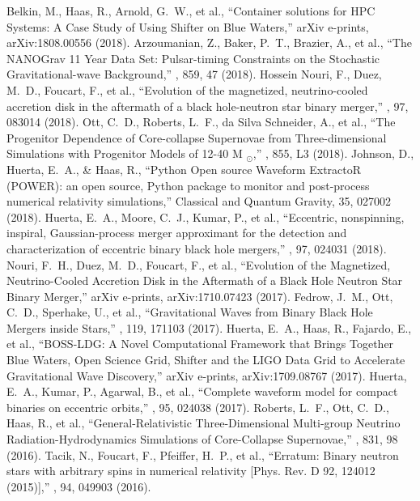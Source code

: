  Belkin, M., Haas, R., Arnold, G.~W., et al., ``Container solutions for HPC Systems: A Case Study of Using Shifter on Blue Waters,'' arXiv e-prints, arXiv:1808.00556 (2018).
 Arzoumanian, Z., Baker, P.~T., Brazier, A., et al., ``The NANOGrav 11 Year Data Set: Pulsar-timing Constraints on the Stochastic Gravitational-wave Background,'' \apj, 859, 47 (2018).
 Hossein Nouri, F., Duez, M.~D., Foucart, F., et al., ``Evolution of the magnetized, neutrino-cooled accretion disk in the aftermath of a black hole-neutron star binary merger,'' \prd, 97, 083014 (2018).
 Ott, C.~D., Roberts, L.~F., da Silva Schneider, A., et al., ``The Progenitor Dependence of Core-collapse Supernovae from Three-dimensional Simulations with Progenitor Models of 12-40 M $_{{\ensuremath{\odot}}}$,'' \apjl, 855, L3 (2018).
 Johnson, D., Huerta, E.~A., \& Haas, R., ``Python Open source Waveform ExtractoR (POWER): an open source, Python package to monitor and post-process numerical relativity simulations,'' Classical and Quantum Gravity, 35, 027002 (2018).
 Huerta, E.~A., Moore, C.~J., Kumar, P., et al., ``Eccentric, nonspinning, inspiral, Gaussian-process merger approximant for the detection and characterization of eccentric binary black hole mergers,'' \prd, 97, 024031 (2018).
 Nouri, F.~H., Duez, M.~D., Foucart, F., et al., ``Evolution of the Magnetized, Neutrino-Cooled Accretion Disk in the Aftermath of a Black Hole Neutron Star Binary Merger,'' arXiv e-prints, arXiv:1710.07423 (2017).
 Fedrow, J.~M., Ott, C.~D., Sperhake, U., et al., ``Gravitational Waves from Binary Black Hole Mergers inside Stars,'' \prl, 119, 171103 (2017).
 Huerta, E.~A., Haas, R., Fajardo, E., et al., ``BOSS-LDG: A Novel Computational Framework that Brings Together Blue Waters, Open Science Grid, Shifter and the LIGO Data Grid to Accelerate Gravitational Wave Discovery,'' arXiv e-prints, arXiv:1709.08767 (2017).
 Huerta, E.~A., Kumar, P., Agarwal, B., et al., ``Complete waveform model for compact binaries on eccentric orbits,'' \prd, 95, 024038 (2017).
 Roberts, L.~F., Ott, C.~D., Haas, R., et al., ``General-Relativistic Three-Dimensional Multi-group Neutrino Radiation-Hydrodynamics Simulations of Core-Collapse Supernovae,'' \apj, 831, 98 (2016).
 Tacik, N., Foucart, F., Pfeiffer, H.~P., et al., ``Erratum: Binary neutron stars with arbitrary spins in numerical relativity [Phys. Rev. D 92, 124012 (2015)],'' \prd, 94, 049903 (2016).
